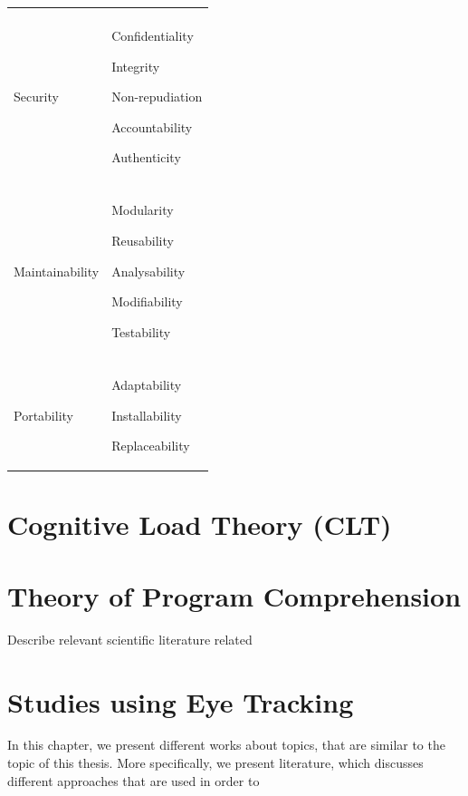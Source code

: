 \begin{table}[h!]
\begin{tabularx}{\textwidth}{X | X }
      
	    \\ \hline
	    \\ %
	    
	   Security	
       
       & Confidentiality
       
       Integrity
       
       Non-repudiation
       
       Accountability
       
       Authenticity
              
       
	    \\ \hline
	    \\ %
	    
	   Maintainability	
       
       &  Modularity
       
       Reusability
       
       Analysability
       
       Modifiability
       
       Testability
     
	    \\ \hline
	    \\ %
	    
	   Portability	
       
       & Adaptability
       
       Installability
       
       Replaceability
        	   
	\end{tabularx}
	\label{tab:table1}
	
\end{table}

\section{Cognitive Load Theory (CLT)}

\section{Theory of Program Comprehension}
Describe relevant scientific literature related 


\section{Studies using Eye Tracking}


In this chapter, we present different works about topics, that are similar to the topic of this thesis. More specifically, we present literature, which discusses different approaches that are used in order to 


